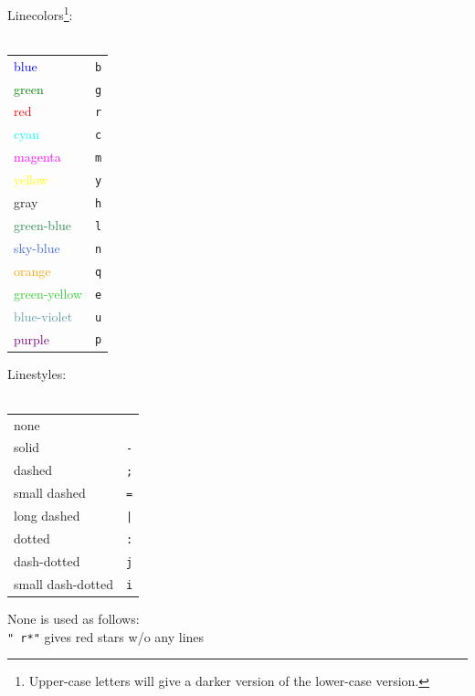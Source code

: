 \documentclass[a4paper]{article}
\begin{document}
\begin{minipage}{3cm}
  Linecolors\footnote{
  Upper-case letters will give a darker version of the lower-case version.
  }:\\ \\
  \begin{tabular}{l|c}
    \textcolor{blue}{blue} & \texttt{b} \\
    \textcolor{green}{green} & \texttt{g} \\
    \textcolor{red}{red} & \texttt{r} \\
    \textcolor{cyan}{cyan} & \texttt{c} \\
    \textcolor{magenta}{magenta} & \texttt{m} \\
    \textcolor{yellow}{yellow} & \texttt{y} \\
    \textcolor[gray]{0.5}{gray} & \texttt{h} \\
    \textcolor{SeaGreen}{green-blue} & \texttt{l} \\
    \textcolor{RoyalBlue}{sky-blue} & \texttt{n} \\
    \textcolor{orange}{orange} & \texttt{q} \\
    \textcolor{LimeGreen}{green-yellow} & \texttt{e} \\
    \textcolor{CadetBlue}{blue-violet} & \texttt{u} \\
    \textcolor{purple}{purple} & \texttt{p}
  \end{tabular}
\end{minipage}
\hfill
\begin{minipage}{4cm}
  Linestyles:\\ \\
  \begin{tabular}{l|c}
    none & \\
    solid & \texttt{-} \\
    dashed & \texttt{;} \\
    small dashed & \texttt{=} \\
    long dashed & \texttt{|} \\
    dotted & \texttt{:} \\
    dash-dotted & \texttt{j} \\
    small dash-dotted & \texttt{i} 
  \end{tabular}
  None is used as follows: \\
  \texttt{" r*"} gives red stars w/o any lines
\end{minipage}
\hfill
\end{document}
